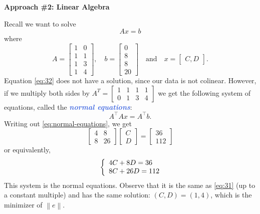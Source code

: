 \documentclass[10pt]{article}
\theoremstyle{definition}
\newcommand{\vt}{\vskip 5mm} %
\newcommand{\Fl}{\vt\noindent\textbf} %
\newcommand{\norm}[1]{\left\lVert#1\right\rVert} %
\newcommand{\1}[1]{\textbf{1}_{\left[#1\right]}} %
\newcommand{\demph}[1]{\textcolor{RoyalBlue}{\textbf{\slshape #1}}} %
\begin{document}
\Fl{Approach \#2: Linear Algebra}

Recall we want to solve
\begin{equation}\label{eq:32}
  Ax=b
\end{equation}
where
\begin{equation*}
  A=
  \begin{bmatrix}
    1&0\\
    1&1\\
    1&3\\
    1&4
  \end{bmatrix},
  \quad
  b=
  \begin{bmatrix}
    0\\8\\8\\20
  \end{bmatrix}
  \quad \text{and} \quad
  x=
  \begin{bmatrix}
    C,D
  \end{bmatrix}.
\end{equation*}
Equation \cref{eq:32} does not have a solution, since our data is not
colinear. However, if we multiply both sides by $A^{T}=
\begin{bmatrix}
  1&1&1&1\\
  0&1&3&4
\end{bmatrix}
$
we get the following system of equations, called the \demph{normal equations}:
\begin{equation}\label{eq:normal-equations}
  A^{\top}Ax=A^{\top}b.
\end{equation}
Writing out \cref{eq:normal-equations}, we get
\begin{equation*}
  \begin{bmatrix}
    4&8\\
    8&26
  \end{bmatrix}
  \begin{bmatrix}
    C\\D
  \end{bmatrix}
  =
  \begin{bmatrix}
    36\\112
  \end{bmatrix}
\end{equation*}
or equivalently,
\begin{equation*}
  \left\{ \begin{array}{l@{}l} 4C+8D=36 \\ 8C+26D=112 \end{array}\right.
\end{equation*}
This system is the normal equations. Observe that it is the same as
\cref{eq:31} (up to a constant multiple) and has the same solution:
$(C,D)=(1,4)$, which is the minimizer of $\norm{e}$.
\end{document}
